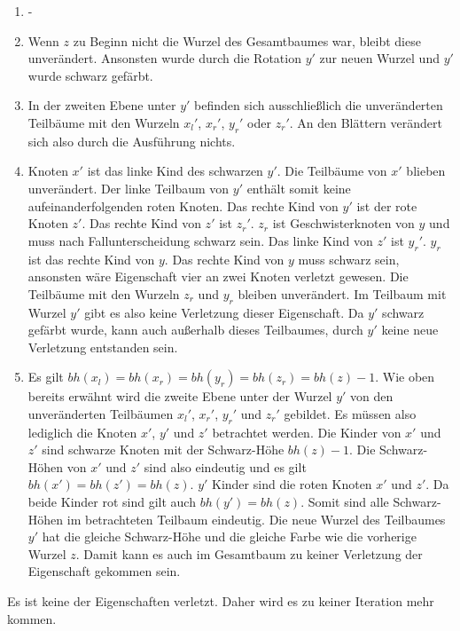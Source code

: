 \documentclass[a4paper,12pt]{article}
\begin{document}
\begin{enumerate}
	\item -
	\item Wenn $z$ zu Beginn nicht die Wurzel des Gesamtbaumes war, bleibt diese unverändert. Ansonsten wurde durch die Rotation $y'$ zur neuen Wurzel und $y'$ wurde schwarz gefärbt. 
	\item  In der zweiten Ebene unter $y'$ befinden sich ausschließlich die unveränderten Teilbäume mit den Wurzeln ${x_l}'$, ${x_r}'$, ${y_r}'$ oder ${z_r}'$. An den Blättern verändert sich also durch die Ausführung nichts.
	\item  Knoten $x'$ ist das linke Kind des schwarzen $y'$. Die Teilbäume von $x'$ blieben unverändert. Der linke Teilbaum von $y'$ enthält somit keine aufeinanderfolgenden roten Knoten. Das rechte Kind von $y'$ ist der rote Knoten $z'$. Das rechte Kind von $z'$ ist ${z_r}'$.  ${z_r}$ ist Geschwisterknoten von $y$ und muss nach Fallunterscheidung schwarz sein. Das linke Kind von $z'$ ist ${y_r}'$. ${y_r}$ ist das rechte Kind von $y$. Das rechte Kind von $y$ muss schwarz sein, ansonsten wäre Eigenschaft vier an zwei Knoten verletzt gewesen. Die Teilbäume mit den Wurzeln ${z_r}$ und  ${y_r}$ bleiben unverändert. Im Teilbaum mit Wurzel $y'$ gibt es also keine Verletzung dieser Eigenschaft. Da $y'$ schwarz gefärbt wurde, kann auch außerhalb dieses Teilbaumes, durch $y'$ keine neue Verletzung entstanden sein.
	\item  Es gilt  $\mathit{bh(x_l)} = \mathit{bh(x_r)} = \mathit{bh(y_r)} =  \mathit{bh(z_r)} = \mathit{bh(z)} - 1$. Wie oben bereits erwähnt wird die zweite Ebene unter der Wurzel $y'$ von den unveränderten Teilbäumen ${x_l}'$, ${x_r}'$, ${y_r}'$ und ${z_r}'$ gebildet. Es müssen also lediglich die Knoten $x'$, $y'$ und $z'$ betrachtet werden. Die Kinder von $x'$ und $z'$ sind schwarze Knoten mit der Schwarz-Höhe $\mathit{bh(z)} - 1$. Die Schwarz-Höhen von $x'$ und $z'$ sind also eindeutig und es gilt \mbox{$\mathit{bh(x')} = \mathit{bh(z')} = \mathit{bh(z)}$}. $y'$ Kinder sind die roten Knoten $x'$ und $z'$. Da beide Kinder rot sind gilt auch  $\mathit{bh(y')}  = \mathit{bh(z)}$. Somit sind alle Schwarz-Höhen im betrachteten Teilbaum eindeutig. Die neue Wurzel des Teilbaumes $y'$ hat die gleiche Schwarz-Höhe und die gleiche Farbe wie die vorherige Wurzel $z$. Damit kann es auch im Gesamtbaum zu keiner Verletzung der Eigenschaft gekommen sein.
\end{enumerate} 

\noindent Es ist keine der Eigenschaften verletzt. Daher wird es zu keiner Iteration mehr kommen.
\end{document}
